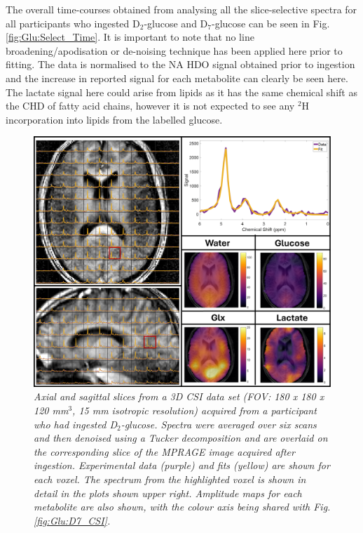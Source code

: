 The overall time-courses obtained from analysing all the slice-selective spectra for all participants who ingested D$_2$-glucose and D$_7$-glucose can be seen in Fig. \ref{fig:Glu:Select_Time}. It is important to note that no line broadening/apodisation or de-noising technique has been applied here prior to fitting. The data is normalised to the \ac{NA} HDO signal obtained prior to ingestion and the increase in reported signal for each metabolite can clearly be seen here. The lactate signal here could arise from lipids as it has the same chemical shift as the CHD of fatty acid chains, however it is not expected to see any $^2$H incorporation into lipids from the labelled glucose.  

\begin{figure}
    \centering
    \includegraphics[width = 1\textwidth]{Figures/Glucose/D2_CSI.png}
    \caption{\textit{Axial and sagittal slices from a 3D \ac{CSI} data set (\ac{FOV}: 180 {\normalfont x} 180 {\normalfont x} 120 mm$^3$, 15 mm isotropic resolution) acquired from a participant who had ingested D$_2$-glucose. Spectra were averaged over six scans and then denoised using a Tucker decomposition and are overlaid on the corresponding slice of the \ac{MPRAGE} image acquired after ingestion. Experimental data (purple) and fits (yellow) are shown for each voxel. The spectrum from the highlighted voxel is shown in detail in the plots shown upper right. Amplitude maps for each metabolite are also shown, with the colour axis being shared with Fig. \ref{fig:Glu:D7_CSI}.}}
    \label{fig:Glu:D2_CSI}
\end{figure}


